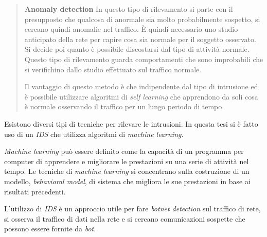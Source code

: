 \documentclass[../main.tex]{subfiles}
\begin{document}
\begin{verse}
				\textbf{Anomaly detection} In questo tipo di rilevamento si parte con il presupposto che qualcosa di anormale sia molto probabilmente sospetto, si cercano quindi anomalie nel traffico. È quindi necessario uno studio anticipato della rete per capire cosa sia normale per il soggetto osservato. Si decide poi quanto è possibile discostarsi dal tipo di attività normale. Questo tipo di rilevamento guarda comportamenti che sono improbabili che si verifichino dallo studio effettuato sul traffico normale.  

				Il vantaggio di questo metodo è che indipendente dal tipo di intrusione ed è possibile utilizzare algoritmi di \textit{self learning} che apprendono da soli cosa è normale osservando il traffico per un lungo periodo di tempo.
\end{verse}



Esistono diversi tipi di tecniche per rilevare le intrusioni. In questa tesi si è fatto uso di un \textit{IDS} che utilizza algoritmi di \textit{machine learning}.

\textit{Machine learning} può essere definito come la capacità di un programma per computer di apprendere e migliorare le prestazioni su una serie di attività nel tempo. Le tecniche di \textit{machine learning} si concentrano sulla costruzione di un modello, \textit{behavioral model}, di sistema che migliora le sue prestazioni in base ai risultati precedenti. \newline


L'utilizzo di \textit{IDS} è un approccio utile per fare \textit{botnet detection} sul traffico di rete, si osserva il traffico di dati nella rete e si cercano comunicazioni sospette che possono essere fornite da \textit{bot}. \newline
\end{document}
